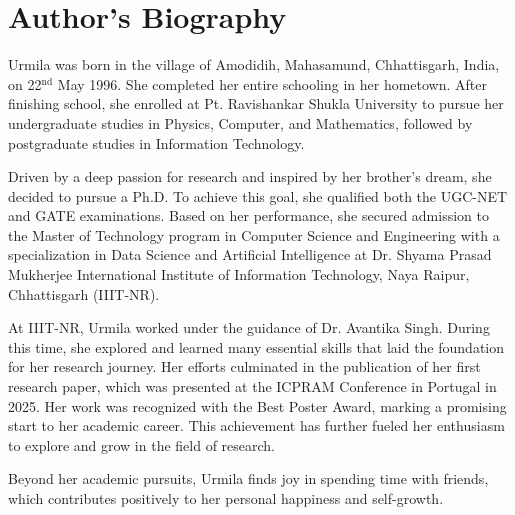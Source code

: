 \chapter*{Author's Biography}
\noindent

{\LARGE U}rmila was born in the village of Amodidih, Mahasamund, Chhattisgarh, India, on 22$^{\mathrm{nd}}$ May 1996. She completed her entire schooling in her hometown. After finishing school, she enrolled at Pt. Ravishankar Shukla University to pursue her undergraduate studies in Physics, Computer, and Mathematics, followed by postgraduate studies in Information Technology.

Driven by a deep passion for research and inspired by her brother's dream, she decided to pursue a Ph.D. To achieve this goal, she qualified both the UGC-NET and GATE examinations. Based on her performance, she secured admission to the Master of Technology program in Computer Science and Engineering with a specialization in Data Science and Artificial Intelligence at Dr. Shyama Prasad Mukherjee International Institute of Information Technology, Naya Raipur, Chhattisgarh (IIIT-NR).

At IIIT-NR, Urmila worked under the guidance of Dr. Avantika Singh. During this time, she explored and learned many essential skills that laid the foundation for her research journey. Her efforts culminated in the publication of her first research paper, which was presented at the ICPRAM Conference in Portugal in 2025. Her work was recognized with the Best Poster Award, marking a promising start to her academic career. This achievement has further fueled her enthusiasm to explore and grow in the field of research.

Beyond her academic pursuits, Urmila finds joy in spending time with friends, which contributes positively to her personal happiness and self-growth.



\vspace*{0.15\textheight}


